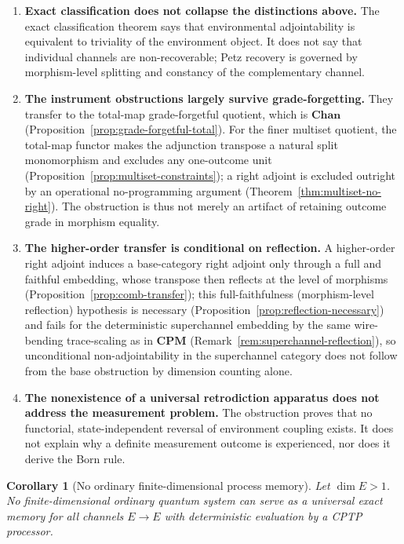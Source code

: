 \documentclass[11pt]{article}
\newtheorem{corollary}[theorem]{Corollary}
\begin{document}
\begin{enumerate}[label=\arabic*., leftmargin=*]
\item \textbf{Exact classification does not collapse the distinctions
above.} The exact classification theorem says that environmental
adjointability is equivalent to triviality of the environment object. It
does not say that individual channels are non-recoverable; Petz recovery is
governed by morphism-level splitting and constancy of the complementary
channel.

\item \textbf{The instrument obstructions largely survive grade-forgetting.}
They transfer to the total-map grade-forgetful quotient, which is $\mathbf{Chan}$
(Proposition~\ref{prop:grade-forgetful-total}). For the finer multiset quotient,
the total-map functor makes the adjunction transpose a natural split
monomorphism and excludes any one-outcome unit
(Proposition~\ref{prop:multiset-constraints}); a right adjoint is excluded
outright by an operational no-programming argument
(Theorem~\ref{thm:multiset-no-right}). The obstruction is thus not
merely an artifact of retaining outcome grade in morphism equality.

\item \textbf{The higher-order transfer is conditional on reflection.} A
higher-order right adjoint induces a base-category right adjoint only through a
full and faithful embedding, whose transpose then reflects at the level of
morphisms (Proposition~\ref{prop:comb-transfer}); this full-faithfulness
(morphism-level reflection) hypothesis is
necessary (Proposition~\ref{prop:reflection-necessary}) and fails for the
deterministic superchannel embedding by the same wire-bending trace-scaling
as in $\mathbf{CPM}$ (Remark~\ref{rem:superchannel-reflection}), so
unconditional non-adjointability in the superchannel category does not follow
from the base obstruction by dimension counting alone.

\item \textbf{The nonexistence of a universal retrodiction apparatus does
not address the measurement problem.} The obstruction proves that no
functorial, state-independent reversal of environment coupling exists. It
does not explain why a definite measurement outcome is experienced, nor
does it derive the Born rule.
\end{enumerate}

\begin{corollary}[No ordinary finite-dimensional process memory]
\label{cor:no-ordinary-process-memory}
Let $\dim E>1$. No finite-dimensional ordinary quantum system can serve as
a universal exact memory for all channels $E\to E$ with deterministic
evaluation by a CPTP processor.
\end{corollary}
\end{document}
